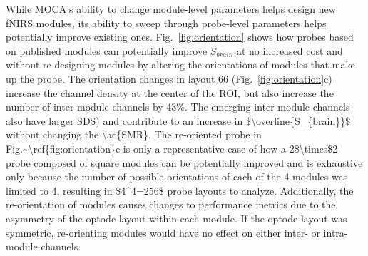 While \ac{MOCA}'s ability to change module-level parameters helps design new \ac{fNIRS} modules, its ability to sweep through probe-level parameters helps potentially improve existing ones. Fig.~\ref{fig:orientation} shows how probes based on published modules can potentially improve $\overline{S_{brain}}$ at no increased cost and without re-designing modules by altering the orientations of modules that make up the probe. The orientation changes in layout 66 (Fig.~\ref{fig:orientation}c) increase the channel density at the center of the \ac{ROI}, but also increase the number of inter-module channels by 43\%. The emerging inter-module channels also have larger \ac{SDS) and contribute to an increase in $\overline{S_{brain}}$ without changing the \ac{SMR}. The re-oriented probe in Fig.~\ref{fig:orientation}c is only a representative case of how a 2$\times$2 probe composed of square modules can be potentially improved and is exhaustive only because the number of possible orientations of each of the 4 modules was limited to 4, resulting in $4^4=256$ probe layouts to analyze. Additionally, the re-orientation of modules causes changes to performance metrics due to the asymmetry of the optode layout within each module. If the optode layout was symmetric, re-orienting modules would have no effect on either inter- or intra-module channels. 

}
